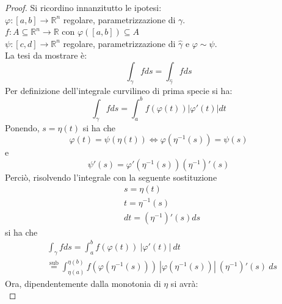     \begin{proof}
        Si ricordino innanzitutto le ipotesi:\\
        \indent $\varphi:[a,b]\to \mathbb{R}^n$ regolare, parametrizzazione di $\gamma$.\\
        \indent $f:A\subseteq\mathbb{R}^n \to \mathbb{R}$ con $\varphi([a,b]) \subseteq A$\\
        \indent $\psi:[c, d]\to \mathbb{R}^n$ regolare, parametrizzazione di $\hat{\gamma}$ e $\varphi \sim \psi$.\\
        La tesi da mostrare è:
        \begin{equation}
            \int_\gamma{f ds}=\int_{\hat{\gamma}}{f ds}
        \end{equation}
        Per definizione dell'integrale curvilineo di prima specie si ha:
        \begin{equation}
            \int_\gamma{fds}= \int_{a}^{b}{f(\varphi(t))|\varphi'(t)|dt}
        \end{equation}
        Ponendo, $s=\eta(t)$ si ha che
        \begin{equation}
            \varphi(t)=\psi(\eta(t)) \iff \varphi(\eta^{-1}(s))=\psi(s)    
        \end{equation}
        e
        \begin{equation}
            \psi'(s)=\varphi'(\eta^{-1}(s))(\eta^{-1})'(s)
        \end{equation}
        Perciò, risolvendo l'integrale con la seguente sostituzione 
        \begin{equation}
            \begin{aligned}
            &s=\eta(t) \\ &t=\eta^{-1}(s) \\ &dt=(\eta^{-1})'(s)ds
            \end{aligned}
        \end{equation}
        si ha che
        \begin{equation}
            \begin{aligned}
                &\int_\gamma{fds} = \int_{a}^{b}{f(\varphi(t))\ |\varphi'(t)|\ dt}\\
                &\overset{\text{sub}}{=} \int_{\eta(a)}^{\eta(b)}{f(\varphi(\eta^{-1}(s)))\ |\varphi(\eta^{-1}(s))|\ (\eta^{-1})'(s)\ ds}
            \end{aligned}
        \end{equation}
        Ora, dipendentemente dalla monotonia di $\eta$ si avrà:\\

\end{proof}
